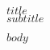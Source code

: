 \documentclass[$if(fontsize)$$fontsize$,$endif$$if(lang)$$babel-lang$,$endif$$if(papersize)$$papersize$paper,$endif$$for(classoption)$$classoption$$sep$,$endfor$]{$documentclass$}
\begin{document}
\begin{center}
\Large{\textsc{$title$}}\\ \small{\textit{$subtitle$}}\\
\vspace*{\baselineskip}
\end{center}

$body$
\end{document}
